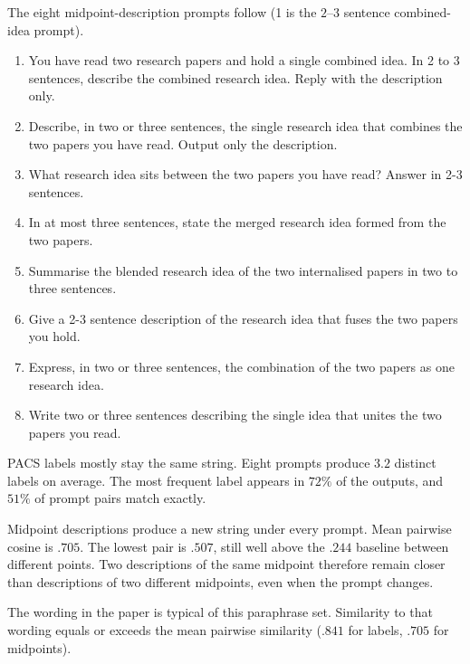 The eight midpoint-description prompts follow (1 is the $2$--$3$ sentence combined-idea prompt).
\begin{enumerate}[leftmargin=1.8em,itemsep=2pt,parsep=0pt,topsep=4pt]
\footnotesize
\item You have read two research papers and hold a single combined idea. In 2 to 3 sentences, describe the combined research idea. Reply with the description only.
\item Describe, in two or three sentences, the single research idea that combines the two papers you have read. Output only the description.
\item What research idea sits between the two papers you have read? Answer in 2-3 sentences.
\item In at most three sentences, state the merged research idea formed from the two papers.
\item Summarise the blended research idea of the two internalised papers in two to three sentences.
\item Give a 2-3 sentence description of the research idea that fuses the two papers you hold.
\item Express, in two or three sentences, the combination of the two papers as one research idea.
\item Write two or three sentences describing the single idea that unites the two papers you read.
\end{enumerate}

PACS labels mostly stay the same string.
Eight prompts produce $3.2$ distinct labels on average.
The most frequent label appears in $72\%$ of the outputs, and $51\%$ of prompt pairs match exactly.

Midpoint descriptions produce a new string under every prompt.
Mean pairwise cosine is $.705$.
The lowest pair is $.507$, still well above the $.244$ baseline between different points.
Two descriptions of the same midpoint therefore remain closer than descriptions of two different midpoints, even when the prompt changes.

The wording in the paper is typical of this paraphrase set.
Similarity to that wording equals or exceeds the mean pairwise similarity ($.841$ for labels, $.705$ for midpoints).

\begin{table}[h]
\centering
\scriptsize
\setlength{\tabcolsep}{4pt}
\caption{Prompt sensitivity. $K$ is the number of semantically equivalent prompts per point, the first being the one the paper reports. \emph{mean pairwise sim.}\ averages SBERT cosine over prompt pairs for the same point; \emph{sim.\ to the reported prompt} compares the other seven against it. \emph{identical strings} is the fraction of those prompt pairs that emit the same text after lowercasing. Two different PACS nodes decoded under one prompt have mean cosine $.463$. Two different midpoints decoded under one prompt have mean cosine $.244$.}
\label{tab:psens}

\end{table}


